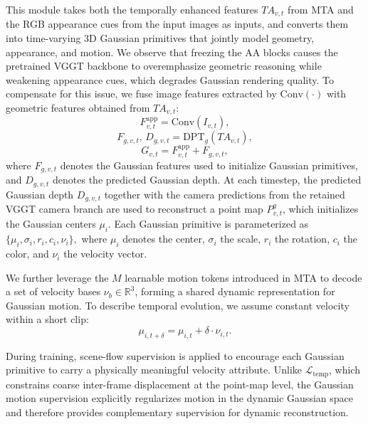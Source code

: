This module takes both the temporally enhanced features $TA_{v,t}$ from MTA and the RGB appearance cues from the input images as inputs, and converts them into time-varying 3D Gaussian primitives that jointly model geometry, appearance, and motion. 
We observe that freezing the AA blocks causes the pretrained VGGT backbone to overemphasize geometric reasoning while weakening appearance cues, which degrades Gaussian rendering quality. 
To compensate for this issue, we fuse image features extracted by $\mathrm{Conv}(\cdot)$ with geometric features obtained from $TA_{v,t}$:
\begin{equation}
F_{v,t}^{\mathrm{app}} = \mathrm{Conv}(I_{v,t}),
\end{equation}
\begin{equation}
F_{g,v,t},\, D_{g,v,t} = \mathrm{DPT}_{g}(TA_{v,t}),
\end{equation}
\begin{equation}
G_{v,t} = F_{v,t}^{\mathrm{app}} + F_{g,v,t},
\end{equation}
where $F_{g,v,t}$ denotes the Gaussian features used to initialize Gaussian primitives, and $D_{g,v,t}$ denotes the predicted Gaussian depth.
At each timestep, the predicted Gaussian depth $D_{g,v,t}$ together with the camera predictions from the retained VGGT camera branch are used to reconstruct a point map $P_{v,t}^{g}$, which initializes the Gaussian centers $\mu_i$. 
Each Gaussian primitive is parameterized as
$
\{\mu_i, \sigma_i, r_i, c_i, \nu_i\},
$
where $\mu_i$ denotes the center, $\sigma_i$ the scale, $r_i$ the rotation, $c_i$ the color, and $\nu_i$ the velocity vector.

We further leverage the $M$ learnable motion tokens introduced in MTA to decode a set of velocity bases $\nu_b \in \mathbb{R}^{3}$, forming a shared dynamic representation for Gaussian motion. 
To describe temporal evolution, we assume constant velocity within a short clip:
\begin{equation}
\mu_{i,t+\delta} = \mu_{i,t} + \delta \cdot \nu_{i,t}.
\end{equation}

During training, scene-flow supervision is applied to encourage each Gaussian primitive to carry a physically meaningful velocity attribute. 
Unlike $\mathcal{L}_{\mathrm{temp}}$, which constrains coarse inter-frame displacement at the point-map level, the Gaussian motion supervision explicitly regularizes motion in the dynamic Gaussian space and therefore provides complementary supervision for dynamic reconstruction.

